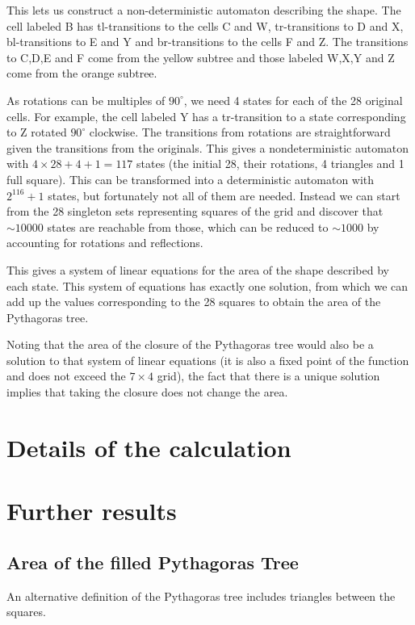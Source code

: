 \documentclass{article}
\begin{document}
This lets us construct a non-deterministic automaton describing the shape. The cell labeled B has tl-transitions to the cells C and W, tr-transitions to D and X, bl-transitions to E and Y and br-transitions to the cells F and Z. The transitions to C,D,E and F come from the yellow subtree and those labeled W,X,Y and Z come from the orange subtree.

As rotations can be multiples of $90^\circ$, we need 4 states for each of the 28 original cells. For example, the cell labeled Y has a tr-transition to a state corresponding to Z rotated $90^\circ$ clockwise.  The transitions from rotations are straightforward given the transitions from the originals. This gives a nondeterministic automaton with $4\times28+4+1 = 117$ states (the initial 28, their rotations, 4 triangles and 1 full square). This can be transformed into a deterministic automaton with $2^{116}+1$ states, but fortunately not all of them are needed. Instead we can start from the 28 singleton sets representing squares of the grid and discover that ${\sim}10000$ states are reachable from those, which can be reduced to ${\sim}1000$ by accounting for rotations and reflections.

This gives a system of linear equations for the area of the shape described by each state. This system of equations has exactly one solution, from which we can add up the values corresponding to the 28 squares to obtain the area of the Pythagoras tree.

Noting that the area of the closure of the Pythagoras tree would also be a solution to that system of linear equations (it is also a fixed point of the function and does not exceed the $7\times 4$ grid), the fact that there is a unique solution implies that taking the closure does not change the area.

\section{Details of the calculation}


\section{Further results}
\subsection{Area of the filled Pythagoras Tree}
An alternative definition of the Pythagoras tree includes triangles between the squares.
\end{document}
